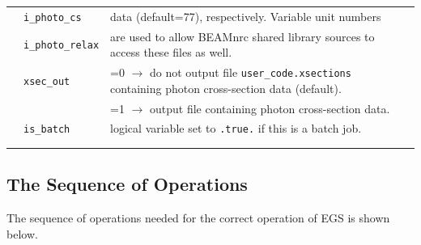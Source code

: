 \begin{table}[htb]
\begin{center}
\begin{tabular}{ l  l   p{105mm}l  |}
& {\tt i\_photo\_cs} & data (default=77), respectively.  Variable unit numbers\\
& {\tt i\_photo\_relax} & are used to allow BEAMnrc shared library sources to
access these files as well.\\
& {\tt xsec\_out} & =0 $\rightarrow$ do not output file {\tt user\_code.xsections} containing photon cross-section data (default).\\
&& =1 $\rightarrow$ output file containing photon cross-section data.\\
& {\tt is\_batch} & logical variable set to {\tt .true.} if this is a batch
job.\\
&&\\
\hline
&&\\
\end{tabular}
\end{center}
\end{table}
\clearpage

\subsection{The Sequence of Operations}

The sequence of operations needed for the correct operation of EGS is
shown below.

